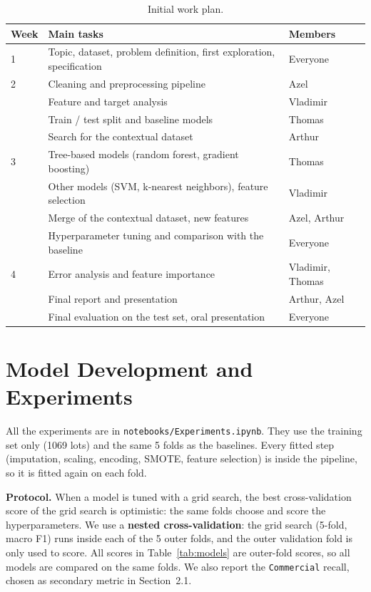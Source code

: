 \documentclass{article}
\begin{document}
\begin{table}[h]
  \centering
  \small
  \caption{Initial work plan.}
  \label{tab:plan}
  \begin{tabular}{lll}
    \toprule
    Week & Main tasks & Members \\
    \midrule
    1 & Topic, dataset, problem definition, first exploration, specification & Everyone \\
    \midrule
    2 & Cleaning and preprocessing pipeline & Azel \\
      & Feature and target analysis & Vladimir \\
      & Train / test split and baseline models & Thomas \\
      & Search for the contextual dataset & Arthur \\
    \midrule
    3 & Tree-based models (random forest, gradient boosting) & Thomas \\
      & Other models (SVM, k-nearest neighbors), feature selection & Vladimir \\
      & Merge of the contextual dataset, new features & Azel, Arthur \\
      & Hyperparameter tuning and comparison with the baseline & Everyone \\
    \midrule
    4 & Error analysis and feature importance & Vladimir, Thomas \\
      & Final report and presentation & Arthur, Azel \\
      & Final evaluation on the test set, oral presentation & Everyone \\
    \bottomrule
  \end{tabular}
\end{table}

\section{Model Development and Experiments}

All the experiments are in \texttt{notebooks/Experiments.ipynb}. They use the training set only (1069 lots) and the same 5 folds as the baselines. Every fitted step (imputation, scaling, encoding, SMOTE, feature selection) is inside the pipeline, so it is fitted again on each fold.

\textbf{Protocol.} When a model is tuned with a grid search, the best cross-validation score of the grid search is optimistic: the same folds choose and score the hyperparameters. We use a \textbf{nested cross-validation}: the grid search (5-fold, macro F1) runs inside each of the 5 outer folds, and the outer validation fold is only used to score. All scores in Table~\ref{tab:models} are outer-fold scores, so all models are compared on the same folds. We also report the \texttt{Commercial} recall, chosen as secondary metric in Section~2.1.
\end{document}
